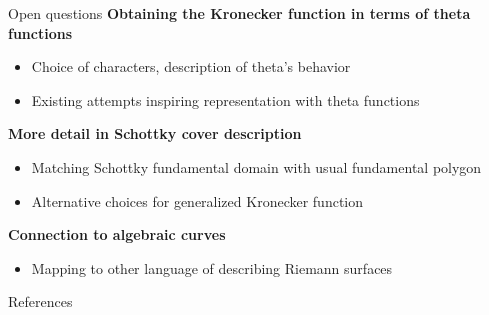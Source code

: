 \documentclass[11pt,aspectratio=169]{beamer}
\begin{document}
\begin{frame}{Open questions}
    \textbf{Obtaining the Kronecker function in terms of theta functions}
    \begin{itemize}
        \item Choice of characters, description of theta's behavior
        \item Existing attempts inspiring representation with theta functions
    \end{itemize}

    \textbf{More detail in Schottky cover description}
    \begin{itemize}
        \item Matching Schottky fundamental domain with usual fundamental polygon
        \item Alternative choices for generalized Kronecker function
    \end{itemize}

    \textbf{Connection to algebraic curves}
    \begin{itemize}
        \item Mapping to other language of describing Riemann surfaces
    \end{itemize}
\end{frame}

\begin{frame}{References}
    \printbibliography{}
\end{frame}
\end{document}
